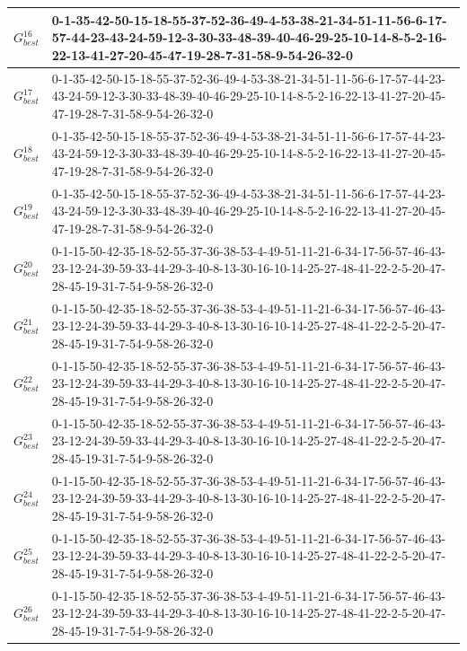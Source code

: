 \begin{landscape}
{\begin{tabularx}{\linewidth}{|c|X|}
        $G_{best}^{16}$  & 0-1-35-42-50-15-18-55-37-52-36-49-4-53-38-21-34-51-11-56-6-17-57-44-23-43-24-59-12-3-30-33-48-39-40-46-29-25-10-14-8-5-2-16-22-13-41-27-20-45-47-19-28-7-31-58-9-54-26-32-0 \\ \hline
        $G_{best}^{17}$  & 0-1-35-42-50-15-18-55-37-52-36-49-4-53-38-21-34-51-11-56-6-17-57-44-23-43-24-59-12-3-30-33-48-39-40-46-29-25-10-14-8-5-2-16-22-13-41-27-20-45-47-19-28-7-31-58-9-54-26-32-0 \\ \hline
        $G_{best}^{18}$  & 0-1-35-42-50-15-18-55-37-52-36-49-4-53-38-21-34-51-11-56-6-17-57-44-23-43-24-59-12-3-30-33-48-39-40-46-29-25-10-14-8-5-2-16-22-13-41-27-20-45-47-19-28-7-31-58-9-54-26-32-0 \\ \hline
        $G_{best}^{19}$  & 0-1-35-42-50-15-18-55-37-52-36-49-4-53-38-21-34-51-11-56-6-17-57-44-23-43-24-59-12-3-30-33-48-39-40-46-29-25-10-14-8-5-2-16-22-13-41-27-20-45-47-19-28-7-31-58-9-54-26-32-0 \\ \hline
        $G_{best}^{20}$  & 0-1-15-50-42-35-18-52-55-37-36-38-53-4-49-51-11-21-6-34-17-56-57-46-43-23-12-24-39-59-33-44-29-3-40-8-13-30-16-10-14-25-27-48-41-22-2-5-20-47-28-45-19-31-7-54-9-58-26-32-0 \\ \hline
        $G_{best}^{21}$  & 0-1-15-50-42-35-18-52-55-37-36-38-53-4-49-51-11-21-6-34-17-56-57-46-43-23-12-24-39-59-33-44-29-3-40-8-13-30-16-10-14-25-27-48-41-22-2-5-20-47-28-45-19-31-7-54-9-58-26-32-0 \\ \hline
        $G_{best}^{22}$  & 0-1-15-50-42-35-18-52-55-37-36-38-53-4-49-51-11-21-6-34-17-56-57-46-43-23-12-24-39-59-33-44-29-3-40-8-13-30-16-10-14-25-27-48-41-22-2-5-20-47-28-45-19-31-7-54-9-58-26-32-0 \\ \hline
        $G_{best}^{23}$  & 0-1-15-50-42-35-18-52-55-37-36-38-53-4-49-51-11-21-6-34-17-56-57-46-43-23-12-24-39-59-33-44-29-3-40-8-13-30-16-10-14-25-27-48-41-22-2-5-20-47-28-45-19-31-7-54-9-58-26-32-0 \\ \hline
        $G_{best}^{24}$  & 0-1-15-50-42-35-18-52-55-37-36-38-53-4-49-51-11-21-6-34-17-56-57-46-43-23-12-24-39-59-33-44-29-3-40-8-13-30-16-10-14-25-27-48-41-22-2-5-20-47-28-45-19-31-7-54-9-58-26-32-0 \\ \hline
        $G_{best}^{25}$  & 0-1-15-50-42-35-18-52-55-37-36-38-53-4-49-51-11-21-6-34-17-56-57-46-43-23-12-24-39-59-33-44-29-3-40-8-13-30-16-10-14-25-27-48-41-22-2-5-20-47-28-45-19-31-7-54-9-58-26-32-0 \\ \hline
        $G_{best}^{26}$  & 0-1-15-50-42-35-18-52-55-37-36-38-53-4-49-51-11-21-6-34-17-56-57-46-43-23-12-24-39-59-33-44-29-3-40-8-13-30-16-10-14-25-27-48-41-22-2-5-20-47-28-45-19-31-7-54-9-58-26-32-0 \\ \hline

\end{tabularx}}
\end{landscape}
